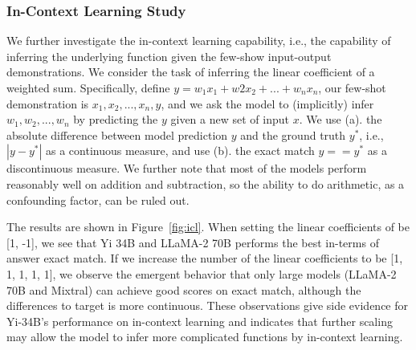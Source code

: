 \subsubsection{In-Context Learning Study}
% 
We further investigate the in-context learning capability, i.e., the capability of inferring the underlying function given the few-show input-output demonstrations.
We consider the task of inferring the linear coefficient of a weighted sum.
Specifically, define $y = w_1x_1 + w2x_2 + ... + w_nx_n$, our few-shot demonstration is $x_1, x_2, ..., x_n, y$, and we ask the model to (implicitly) infer $w_1, w_2, ..., w_n$ by predicting the $y$ given a new set of input $x$. 
We use (a). the absolute difference between model prediction $y$ and the ground truth $y^*$, i.e., $|y - y^*|$ as a continuous measure, and use (b). the exact match $y == y^*$ as a discontinuous measure.
We further note that most of the models perform reasonably well on addition and subtraction, so the ability to do arithmetic, as a confounding factor, can be ruled out. 

The results are shown in Figure~\ref{fig:icl}.
When setting the linear coefficients of be [1, -1], we see that Yi 34B and LLaMA-2 70B performs the best in-terms of answer exact match. 
If we increase the number of the linear coefficients to be [1, 1, 1, 1, 1], we observe the emergent behavior that only large models (LLaMA-2 70B and Mixtral) can achieve good scores on exact match, although the differences to target is more continuous. 
These observations give side evidence for Yi-34B's performance on in-context learning and indicates that further scaling may allow the model to infer more complicated functions by in-context learning.